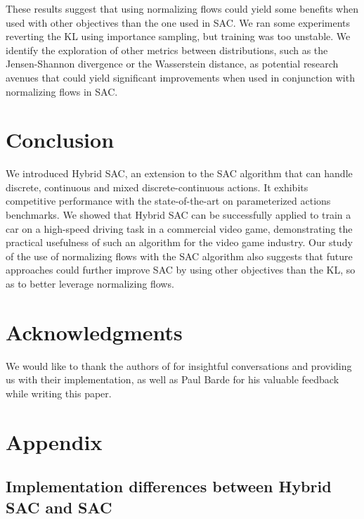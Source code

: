 \documentclass[letterpaper]{article} \usepackage{aaai20}  \usepackage{times}  \usepackage{helvet} \usepackage{courier}  \usepackage[hyphens]{url}  \usepackage{graphicx} \urlstyle{rm} \def\UrlFont{\rm}  \usepackage{graphicx}  \usepackage[section]{placeins}
\begin{document}
These results suggest that using normalizing flows could yield some benefits when used with other objectives than the one used in SAC. We ran some experiments reverting the KL using importance sampling, but training was too unstable. We identify the exploration of other metrics between distributions, such as the Jensen-Shannon divergence or the Wasserstein distance, as potential research avenues that could yield significant improvements when used in conjunction with normalizing flows in SAC.


\section{Conclusion}

We introduced Hybrid SAC, an extension to the SAC algorithm that can handle discrete, continuous and mixed discrete-continuous actions. It exhibits competitive performance with the state-of-the-art on parameterized actions benchmarks. We showed that Hybrid SAC can be successfully applied to train a car on a high-speed driving task in a commercial video game, demonstrating the practical usefulness of such an algorithm for the video game industry. Our study of the use of normalizing flows with the SAC algorithm also suggests that future approaches could further improve SAC by using other objectives than the KL, so as to better leverage normalizing flows.

\section{Acknowledgments}

We would like to thank the authors of \cite{mazoure2019leveraging} for insightful conversations and providing us with their implementation, as well as Paul Barde for his valuable feedback while writing this paper.   




\newpage

\section{Appendix}





\subsection{Implementation differences between Hybrid SAC and SAC} 
\end{document}
